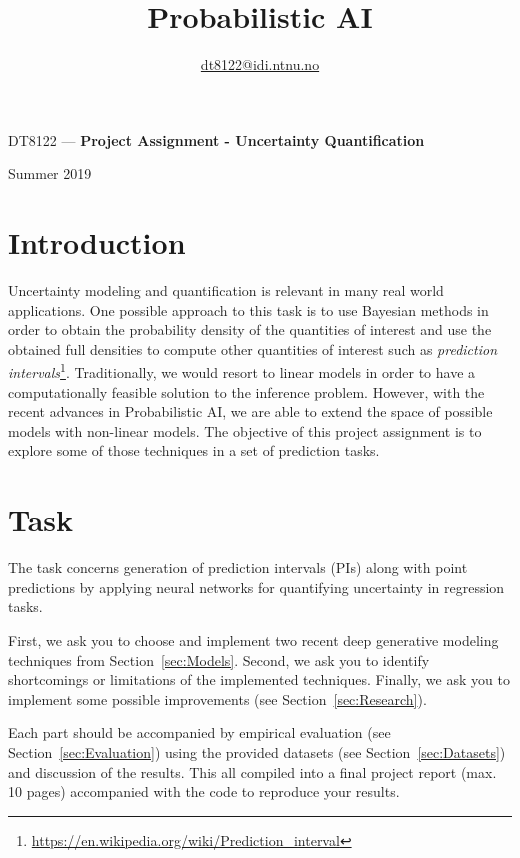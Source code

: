 \documentclass[a4paper, 12pt]{article}
\begin{document}
\title{Probabilistic AI}{DT8122 — \textbf{Project Assignment - Uncertainty Quantification}}
\author{\textcolor{blue}{\href{mailto:dt8122@idi.ntnu.no}{dt8122@idi.ntnu.no}}}
\begin{center}
\vspace{-0.5cm}
Summer 2019
\end{center}


\section{Introduction}
\label{sec:Introduction}

Uncertainty modeling and quantification is relevant in many real world applications. One possible
approach to this task is to use Bayesian methods in order to obtain the probability density of the
quantities of interest and use the obtained full densities to compute other quantities of interest
such as \textit{prediction
intervals}\footnote{\url{https://en.wikipedia.org/wiki/Prediction_interval}}. Traditionally, we
would resort to linear models in order to have a computationally feasible solution to the inference
problem. However, with the recent advances in Probabilistic AI, we are able to extend the space of
possible models with non-linear models. The objective of this project assignment is to explore some
of those techniques in a set of prediction tasks.

\section{Task}
\label{sec:Task}

The task concerns generation of prediction intervals (PIs) along with point predictions by applying
neural networks for quantifying uncertainty in regression tasks.

First, we ask you to choose and implement two recent deep generative modeling techniques from
Section~\ref{sec:Models}. Second, we ask you to identify shortcomings or limitations of the
implemented techniques. Finally, we ask you to implement some possible improvements (see
Section~\ref{sec:Research}).

Each part should be accompanied by empirical evaluation (see Section~\ref{sec:Evaluation}) using the
provided datasets (see Section~\ref{sec:Datasets}) and discussion of the results. This all compiled
into a final project report (max. 10 pages) accompanied with the code to reproduce your results.
\end{document}
